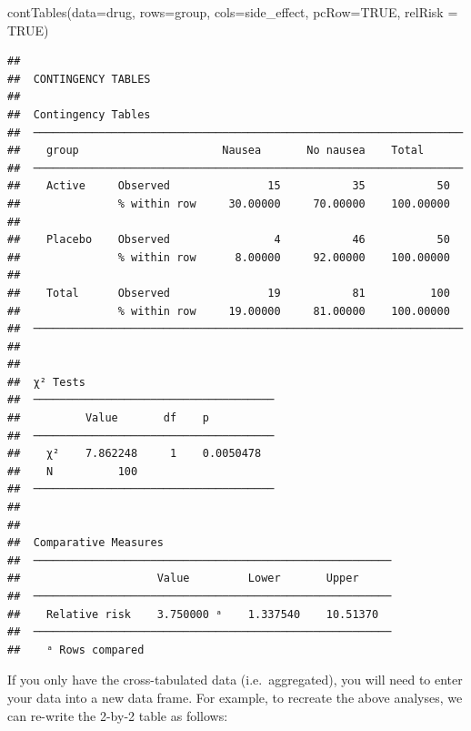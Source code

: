 \documentclass[
]{memoir}
\newenvironment{Shaded}{\begin{snugshade}}{\end{snugshade}}
\newcommand{\AttributeTok}[1]{\textcolor[rgb]{0.77,0.63,0.00}{#1}}
\newcommand{\ConstantTok}[1]{\textcolor[rgb]{0.00,0.00,0.00}{#1}}
\newcommand{\FunctionTok}[1]{\textcolor[rgb]{0.00,0.00,0.00}{#1}}
\newcommand{\NormalTok}[1]{#1}
\begin{document}
\begin{Shaded}
\begin{Highlighting}[]
\FunctionTok{contTables}\NormalTok{(}\AttributeTok{data=}\NormalTok{drug, }
           \AttributeTok{rows=}\NormalTok{group, }\AttributeTok{cols=}\NormalTok{side\_effect, }
           \AttributeTok{pcRow=}\ConstantTok{TRUE}\NormalTok{, }\AttributeTok{relRisk =} \ConstantTok{TRUE}\NormalTok{)}
\end{Highlighting}
\end{Shaded}

\begin{verbatim}
## 
##  CONTINGENCY TABLES
## 
##  Contingency Tables                                                 
##  ────────────────────────────────────────────────────────────────── 
##    group                      Nausea       No nausea    Total       
##  ────────────────────────────────────────────────────────────────── 
##    Active     Observed               15           35           50   
##               % within row     30.00000     70.00000    100.00000   
##                                                                     
##    Placebo    Observed                4           46           50   
##               % within row      8.00000     92.00000    100.00000   
##                                                                     
##    Total      Observed               19           81          100   
##               % within row     19.00000     81.00000    100.00000   
##  ────────────────────────────────────────────────────────────────── 
## 
## 
##  χ² Tests                              
##  ───────────────────────────────────── 
##          Value       df    p           
##  ───────────────────────────────────── 
##    χ²    7.862248     1    0.0050478   
##    N          100                      
##  ───────────────────────────────────── 
## 
## 
##  Comparative Measures                                    
##  ─────────────────────────────────────────────────────── 
##                     Value         Lower       Upper      
##  ─────────────────────────────────────────────────────── 
##    Relative risk    3.750000 ᵃ    1.337540    10.51370   
##  ─────────────────────────────────────────────────────── 
##    ᵃ Rows compared
\end{verbatim}

If you only have the cross-tabulated data (i.e.~aggregated), you will need to enter your data into a new data frame. For example, to recreate the above analyses, we can re-write the 2-by-2 table as follows:
\end{document}

